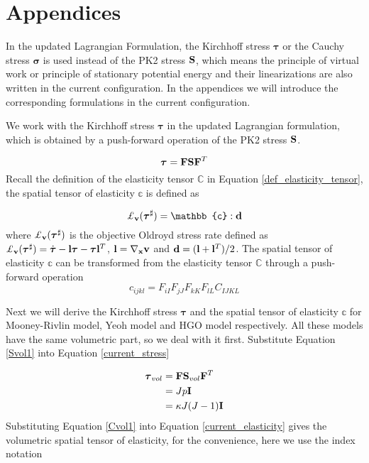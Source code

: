 \section{Appendices}
In the updated Lagrangian Formulation, the Kirchhoff stress $\boldsymbol{\tau}$ or the Cauchy stress $\boldsymbol{\sigma}$ is used instead of the PK2 stress $\bold{S}$, which means the principle of virtual work or principle of stationary potential energy and their linearizations are also written in the current configuration. In the appendices we will introduce the corresponding formulations in the current configuration.

%
We work with the Kirchhoff stress $\boldsymbol{\tau}$ in the updated Lagrangian formulation, which is obtained by a push-forward operation of the PK2 stress $\bold{S}$.

\begin{equation}
\boldsymbol{\tau} = \bold{F}\bold{S}{\bold{F}}^T \label{current_stress}
\end{equation}
Recall the definition of the elasticity tensor $\mathbb{C}$ in Equation \ref{def_elasticity_tensor}, the spatial tensor of elasticity $\mathbb{c}$ is defined as

\begin{equation}
\pounds_{\bold{v}}({\boldsymbol{\tau}}^{\sharp}) = \mathbb{c} : \bold{d}
\end{equation} 
where $\pounds_{\bold{v}}({\boldsymbol{\tau}}^{\sharp})$ is the objective Oldroyd stress rate defined as $\pounds_{\bold{v}}({\boldsymbol{\tau}}^{\sharp}) = \dot{\boldsymbol{\tau}} - \bold{l}\boldsymbol{\tau} - \boldsymbol{\tau}\bold{l}^T$, $\bold{l} = \nabla_{\bold{x}}\bold{v}$ and $\bold{d} = (\bold{l} + {\bold{l}}^T)/2$. 
The spatial tensor of elasticity $\mathbb{c}$ can be transformed from the elasticity tensor $\mathbb{C}$ through a push-forward operation
\begin{equation}
c_{ijkl} = F_{iI}F_{jJ}F_{kK}F_{lL}C_{IJKL} \label{current_elasticity}
\end{equation}

Next we will derive the Kirchhoff stress $\boldsymbol{\tau}$ and the spatial tensor of elasticity $\mathbb{c}$ for Mooney-Rivlin model, Yeoh model and HGO model respectively. All these models have the same volumetric part, so we deal with it first. Substitute Equation \ref{Svol1} into Equation \ref{current_stress}

\begin{subequations}
\label{Tauvol1}
\begin{align}
\boldsymbol{\tau}_{vol} &= \bold{F}\bold{S}_{vol}{\bold{F}}^T \\
				    &= Jp\bold{I} \label{Tauvol11}\\
		      		    &= \kappa J(J-1) \bold{I} \label{Tauvol12}
\end{align}
\end{subequations}
Substituting Equation \ref{Cvol1} into Equation \ref{current_elasticity} gives the volumetric spatial tensor of elasticity, for the convenience, here we use the index notation

